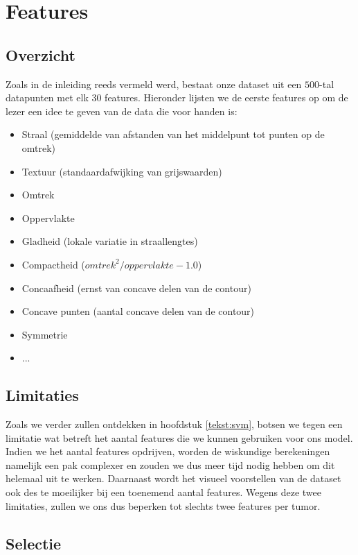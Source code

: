\documentclass[TeamE-eindrapport]{subfiles}
\begin{document}
	
	\chapter{Features}
	
	\section{Overzicht}
	
	Zoals in de inleiding reeds vermeld werd, bestaat onze dataset uit een \(500\)-tal datapunten met elk \(30\) features. Hieronder lijsten we de eerste features op om de lezer een idee te geven van de data die voor handen is:
	
	\begin{itemize}
		\item Straal (gemiddelde van afstanden van het middelpunt tot punten op de omtrek)
		\item Textuur (standaardafwijking van grijswaarden)
		\item Omtrek
		\item Oppervlakte
		\item Gladheid (lokale variatie in straallengtes)
		\item Compactheid (\(omtrek^2 / oppervlakte - 1.0\))
		\item Concaafheid (ernst van concave delen van de contour)
		\item Concave punten (aantal concave delen van de contour)
		\item Symmetrie
		\item ...
	\end{itemize}
	
	\section{Limitaties}
	
	Zoals we verder zullen ontdekken in hoofdstuk \ref{tekst:svm}, botsen we tegen een limitatie wat betreft het aantal features die we kunnen gebruiken voor ons model. Indien we het aantal features opdrijven, worden de wiskundige berekeningen namelijk een pak complexer en zouden we dus meer tijd nodig hebben om dit helemaal uit te werken. Daarnaast wordt het visueel voorstellen van de dataset ook des te moeilijker bij een toenemend aantal features. Wegens deze twee limitaties, zullen we ons dus beperken tot slechts twee features per tumor.
		
	\section{Selectie}
	
\end{document}
